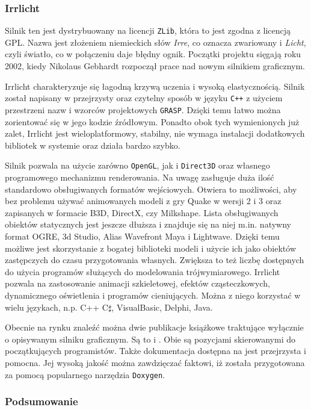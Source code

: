 \documentclass[11pt]{mwrep}
\begin{document}
      \subsubsection{Irrlicht}

      Silnik ten jest dystrybuowany na licencji \texttt{ZLib}, która to jest zgodna z licencją GPL. Nazwa jest złożeniem niemieckich słów \textit{Irre}, co oznacza zwariowany i \textit{Licht}, czyli światło, co w połączeniu daje błędny ognik. Początki projektu sięgają roku 2002, kiedy Nikolaus Gebhardt rozpoczął prace nad nowym silnikiem graficznym.

      Irrlicht charakteryzuje się łagodną krzywą uczenia i wysoką elastycznością. Silnik został napisany w przejrzysty oraz czytelny sposób w języku \texttt{C++} z użyciem przestrzeni nazw i wzorców projektowych \texttt{GRASP}. Dzięki temu łatwo można zorientować się w jego kodzie źródłowym. Ponadto obok tych wymienionych już zalet, Irrlicht jest wieloplatformowy, stabilny, nie wymaga instalacji dodatkowych bibliotek w systemie oraz działa bardzo szybko.

      Silnik pozwala na użycie zarówno \texttt{OpenGL}, jak i \texttt{Direct3D} oraz własnego programowego mechanizmu renderowania. Na uwagę zasługuje duża ilość standardowo obsługiwanych formatów wejściowych. Otwiera to możliwości, aby bez problemu używać animowanych modeli z gry Quake w wersji 2 i 3 oraz zapisanych w formacie B3D, DirectX, czy Milkshape. Lista obsługiwanych obiektów statycznych jest jeszcze dłuższa i znajduje się na niej m.in. natywny format OGRE, 3d Studio, Alias Wavefront Maya i Lightwave. Dzięki temu możliwe jest skorzystanie z bogatej biblioteki modeli i użycie ich jako obiektów zastępczych do czasu przygotowania własnych. Zwiększa to też liczbę dostępnych do użycia programów służących do modelowania trójwymiarowego. Irrlicht pozwala na zastosowanie animacji szkieletowej, efektów cząsteczkowych, dynamicznego oświetlenia i programów cieniujących. Można z niego korzystać w wielu językach, n.p. C++ C$\sharp$, VisualBasic, Delphi, Java.

       Obecnie na rynku znaleźć można dwie publikacje książkowe traktujące wyłącznie o opisywanym silniku graficznym. Są to \cite{irrlichtb1} i \cite{irrlichtb2}. Obie są pozycjami skierowanymi do początkujących programistów. Także dokumentacja dostępna na \cite{irrlichtw} jest przejrzysta i pomocna. Jej wysoką jakość można zawdzięczać faktowi, iż została przygotowana za pomocą popularnego narzędzia \texttt{Doxygen}.

      \subsubsection{Podsumowanie}
\end{document}
